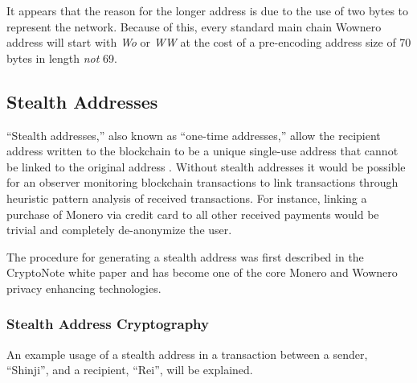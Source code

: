 It appears that the reason for the longer address is due to the use of two bytes to represent the network. Because of this, every standard main chain Wownero address will start with \emph{Wo} or \emph{WW} at the cost of a pre-encoding address size of 70 bytes in length \emph{not} 69.

\subsection{Stealth Addresses}
``Stealth addresses,'' also known as ``one-time addresses,''\cite{zero2monero} allow the recipient address written to the blockchain to be a unique single-use address that cannot be linked to the original address \cite{stack_stealth}. Without stealth addresses it would be possible for an observer monitoring blockchain transactions to link transactions through heuristic pattern analysis of received transactions. For instance, linking a purchase of Monero via credit card to all other received payments would be trivial and completely de-anonymize the user.

The procedure for generating a stealth address was first described in the CryptoNote white paper\cite{CryptoNote} and has become one of the core Monero and Wownero privacy enhancing technologies\cite{moneropedia}.

\subsubsection{Stealth Address Cryptography} \label{sec:SA_example}
An example usage of a stealth address in a transaction between a sender, ``Shinji'', and a recipient, ``Rei'', will be explained\cite{zero2monero,CryptoNote,}. 

